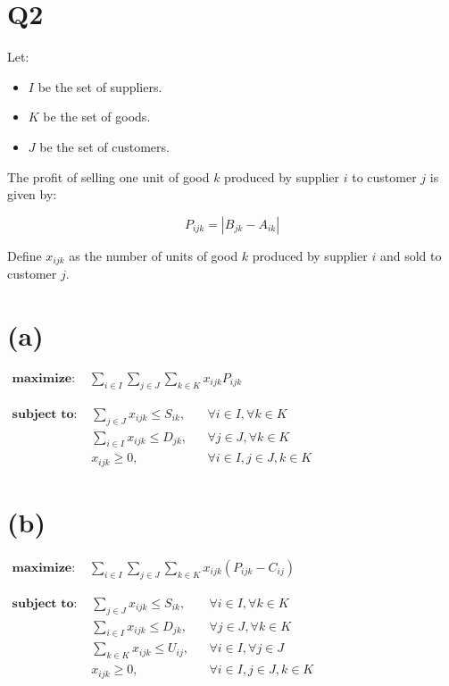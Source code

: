 \section*{Q2}

Let:
\begin{itemize}
    \item \( I \) be the set of suppliers.
    \item \( K \) be the set of goods.
    \item \( J \) be the set of customers.
\end{itemize}

The profit of selling one unit of good \( k \) produced by supplier \( i \) to customer \( j \) is given by:

\[
P_{ijk} = |B_{jk} - A_{ik}|
\]

Define \( x_{ijk} \) as the number of units of good \( k \) produced by supplier \( i \) and sold to customer \( j \).

\section*{(a)}

$
\begin{aligned}
    \textbf{maximize: } & \sum_{i \in I} \sum_{j \in J} \sum_{k \in K} x_{ijk} P_{ijk}
\end{aligned}
$

$
\begin{aligned}
    \textbf{subject to: }
    & \sum_{j \in J} x_{ijk} \leq S_{ik}, && \forall i \in I, \forall k \in K \\
    & \sum_{i \in I} x_{ijk} \leq D_{jk}, && \forall j \in J, \forall k \in K \\
    & x_{ijk} \geq 0, && \forall i \in I, j \in J, k \in K
\end{aligned}
$

\section*{(b)}

$
\begin{aligned}
    \textbf{maximize: } & \sum_{i \in I} \sum_{j \in J} \sum_{k \in K} x_{ijk} (P_{ijk} - C_{ij})
\end{aligned}
$

$
\begin{aligned}
    \textbf{subject to: }
    & \sum_{j \in J} x_{ijk} \leq S_{ik}, && \forall i \in I, \forall k \in K \\
    & \sum_{i \in I} x_{ijk} \leq D_{jk}, && \forall j \in J, \forall k \in K \\
    & \sum_{k \in K} x_{ijk} \leq U_{ij}, && \forall i \in I, \forall j \in J \\
    & x_{ijk} \geq 0, && \forall i \in I, j \in J, k \in K
\end{aligned}
$

